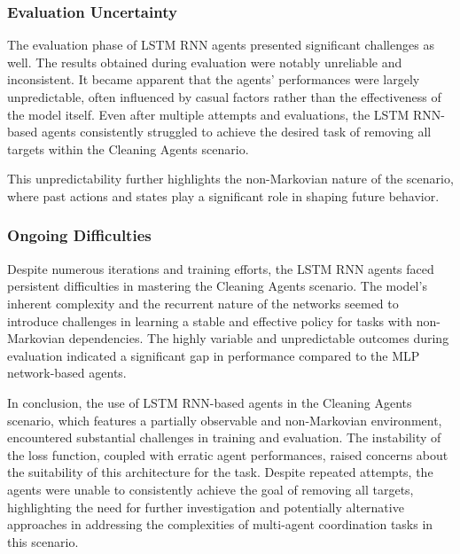 \documentclass{scrartcl}
\begin{document}
\subsubsection{Evaluation Uncertainty}

The evaluation phase of LSTM RNN agents presented significant challenges as well. The results obtained during evaluation were notably unreliable and inconsistent. It became apparent that the agents' performances were largely unpredictable, often influenced by casual factors rather than the effectiveness of the model itself. Even after multiple attempts and evaluations, the LSTM RNN-based agents consistently struggled to achieve the desired task of removing all targets within the Cleaning Agents scenario.

This unpredictability further highlights the non-Markovian nature of the scenario, where past actions and states play a significant role in shaping future behavior.

\subsubsection{Ongoing Difficulties}

Despite numerous iterations and training efforts, the LSTM RNN agents faced persistent difficulties in mastering the Cleaning Agents scenario. The model's inherent complexity and the recurrent nature of the networks seemed to introduce challenges in learning a stable and effective policy for tasks with non-Markovian dependencies. The highly variable and unpredictable outcomes during evaluation indicated a significant gap in performance compared to the MLP network-based agents.

In conclusion, the use of LSTM RNN-based agents in the Cleaning Agents scenario, which features a partially observable and non-Markovian environment, encountered substantial challenges in training and evaluation. The instability of the loss function, coupled with erratic agent performances, raised concerns about the suitability of this architecture for the task. Despite repeated attempts, the agents were unable to consistently achieve the goal of removing all targets, highlighting the need for further investigation and potentially alternative approaches in addressing the complexities of multi-agent coordination tasks in this scenario.

\newpage

%
%
\printbibliography %
\end{document}
